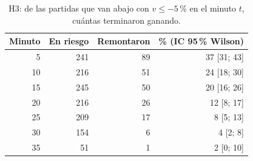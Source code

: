 \begin{table}[H]
\centering\small
\caption{H3: de las partidas que van abajo con \(v \le -5\)\,\% en el minuto \(t\), cuántas terminaron ganando.}
\label{tab:h3curva}
\begin{tabular}{rrrr}
\toprule
Minuto & En riesgo & Remontaron & \% (IC 95\,\% Wilson) \\
\midrule
5 & 241 & 89 & 37 [31; 43] \\
10 & 216 & 51 & 24 [18; 30] \\
15 & 245 & 50 & 20 [16; 26] \\
20 & 216 & 26 & 12 [8; 17] \\
25 & 209 & 17 & 8 [5; 13] \\
30 & 154 & 6 & 4 [2; 8] \\
35 & 51 & 1 & 2 [0; 10] \\
\bottomrule
\end{tabular}
\end{table}
